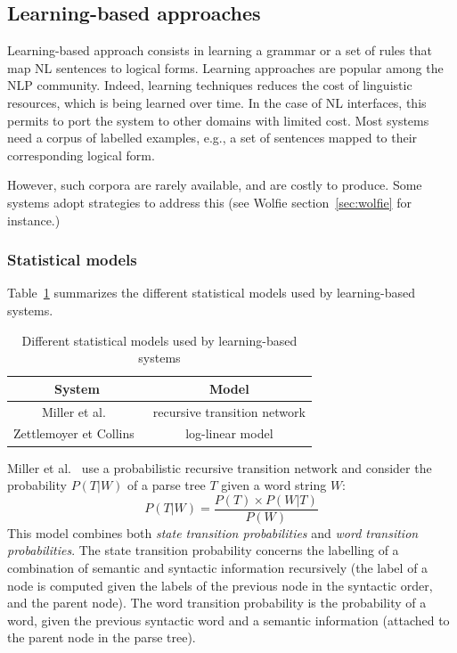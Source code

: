 \documentclass[10pt,journal,letterpaper,compsoc]{IEEEtran}
\begin{document}
\subsection{Learning-based approaches}
Learning-based approach consists in learning a grammar or a set of rules that
map NL sentences to logical forms. 
Learning approaches are popular among the NLP community. Indeed, learning
techniques reduces the cost of linguistic resources, which is being learned over
time.
In the case of NL interfaces, this permits to port the system to other domains
with limited cost. 
Most systems need a corpus of labelled examples, e.g., a set of sentences mapped
to their corresponding logical form.

However, such corpora are rarely available, and are costly to produce.
Some systems adopt strategies to address this (see {\sc Wolfie}
section~\ref{sec:wolfie} for instance.)


\subsubsection{Statistical models}
\label{sec:statistical-model}
Table~\ref{tab:statistical-models} summarizes the different statistical models
used by learning-based systems.
\begin{table}
\centering
\begin{tabular}{|c|c|}\hline
{\bf System} & {\bf Model}\\\hline\hline
Miller et al.~\cite{Miller:1996:FSA:981863.981871} & recursive transition
network\\\hline
Zettlemoyer et Collins~\cite{DBLP:conf/uai/ZettlemoyerC05} & log-linear
model\\\hline
\end{tabular}
\caption{Different statistical models used by learning-based systems}
\label{tab:statistical-models}
\end{table}
Miller et al.~\cite{Miller:1996:FSA:981863.981871} use a probabilistic recursive
transition network and consider the probability $P(T|W)$ of a parse tree $T$
given a word string $W$:
$$P(T|W)=\frac{P(T)\times P(W|T)}{P(W)}$$
This model combines both {\it state transition probabilities} and {\it word
transition probabilities}. The state transition probability concerns the
labelling of a combination of semantic and syntactic information recursively
(the label of a node is computed given the labels of the previous node in the
syntactic order, and the parent node).
The word transition probability is the probability of a word, given the previous
syntactic word and a semantic information (attached to the parent node in the
parse tree).
\end{document}
